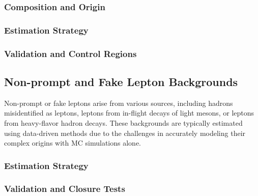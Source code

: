 \subsubsection{Composition and Origin}

\subsubsection{Estimation Strategy}

\subsubsection{Validation and Control Regions}

\subsection{Non-prompt and Fake Lepton Backgrounds}
Non-prompt or fake leptons arise from various sources, including hadrons misidentified as leptons, leptons from in-flight decays of light mesons, or leptons from heavy-flavor hadron decays. These backgrounds are typically estimated using data-driven methods due to the challenges in accurately modeling their complex origins with MC simulations alone.

\subsubsection{Estimation Strategy}

\subsubsection{Validation and Closure Tests}

